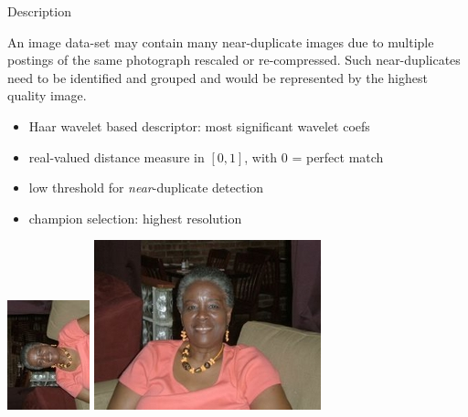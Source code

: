 
\begin{xpsectionbox}{Description}{}

An image data-set may contain many near-duplicate images due to multiple postings of the same photograph rescaled or re-compressed. Such near-duplicates need to be identified and grouped and would be represented by the highest quality image.

\begin{minipage}{0.6\linewidth}

{\vspace*{0.2cm}\noindent\hspace*{0.2cm}{\bf\Titlesize Solution}\newline}{\vspace{-0.75cm}}

\begin{itemize}
	\item Haar wavelet based descriptor: most significant wavelet coefs
	\item real-valued distance measure in $[0,1]$, with 0 = perfect match
	\item low threshold for \emph{near}-duplicate detection
	\item champion selection: highest resolution
\end{itemize}
\end{minipage}
\begin{minipage}{0.5\linewidth}

\begin{center}
			\includegraphics[height=0.25\linewidth]{images/NearDupScaleRot}
			\includegraphics[height=0.25\linewidth]{images/NearDupScale}
\end{center}

\end{minipage}
\end{xpsectionbox}

